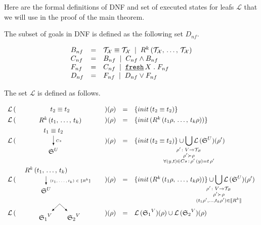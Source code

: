 Here are the formal definitions of DNF and set of executed states for leafs $\mathcal{L}$ that we will use in the proof of the main theorem.

\begin{definition}
The subset of goals in DNF is defined as the following set $D_{nf}$.

\[ \begin{array}{lcl}
B_{nf} & = &  \mathcal{T}_\mathcal{X} \equiv \mathcal{T}_\mathcal{X} \; \mid \;
                     R^k\,(\mathcal{T}_\mathcal{X}, \, \dots, \, \mathcal{T}_\mathcal{X}) \\
C_{nf} & = & B_{nf} \; \mid \; C_{nf} \land B_{nf} \\
F_{nf} & = & C_{nf} \; \mid \; \texttt{\underline {fresh}} \, X\;.\; F_{nf} \\
D_{nf} & = & F_{nf} \; \mid \; D_{nf} \lor F_{nf}
\end{array} \]
\end{definition}

\begin{definition}
The set $\mathcal{L}$ is defined as follows.

\[
\begin{array}{rclcl}
 \mathcal{L}\,(&\parbox[m]{1.3cm}{\schemenode{$\unigoal{t_2}{t_2}$}}&)(\rho) &=& \{init\,(\unigoal{t_2}{t_2})\} \\
 \mathcal{L}\,(&\parbox[m]{2.5cm}{\schemenode{$\invokegoal{R^k}{t_1}{t_k}$}}&)(\rho) &=& \{init\,(\invokegoal{R^k}{t_1 \rho}{t_k \rho})\} \\
 \mathcal{L}\,(&\parbox[m]{2cm}{\schemesarrow{$\unigoal{t_1}{t_2}$}{$Cs$}{$\schemewithvset{\mathfrak{S}}{U}$}} &)(\rho) &=&  \{init\,(\unigoal{t_2}{t_2})\} \cup
      \smashoperator{\bigcup\limits_{\substack{ \rho' \colon V \to \grterms \\
                                      \rho' \succ \rho \\
                                      \forall (y, t) \in Cs\,:\, \rho'\,(y) = t\, \rho'  }}}
           \mathcal{L}\,(\schemewithvset{\mathfrak{S}}{U})(\rho')  \\
 \mathcal{L}\,(& \parbox[m]{4cm}{\schemedarrow{$\invokegoal{R^k}{t_1}{t_k}$}{ $(t_1, \dots, t_k) \in \sembr{R^k}  $}{$\schemewithvset{\mathfrak{S}}{U}$}} &)(\rho) &=&
      \{init\,(\invokegoal{R^k}{t_1 \rho}{t_k \rho})\} \cup
      \smashoperator{\bigcup\limits_{\substack{ \rho' \colon V \to \grterms \\
                                      \rho' \succ \rho \\
                                      (t_1 \rho', \dots, t_k \rho') \in \sembr{R^k}  }}}
           \mathcal{L}\,(\schemewithvset{\mathfrak{S}}{U})(\rho')  \\
 \mathcal{L}\,(&\parbox[m]{2.5cm}{\schemefork{$\schemewithvset{\mathfrak{S}_1}{V}$}{$\schemewithvset{\mathfrak{S}_2}{V}$}}&)(\rho) &=&
 \mathcal{L}\,(\schemewithvset{\mathfrak{S}_1}{V})(\rho) \cup \mathcal{L}\,(\schemewithvset{\mathfrak{S}_2}{V})(\rho)
\end{array}
\]
\end{definition}


